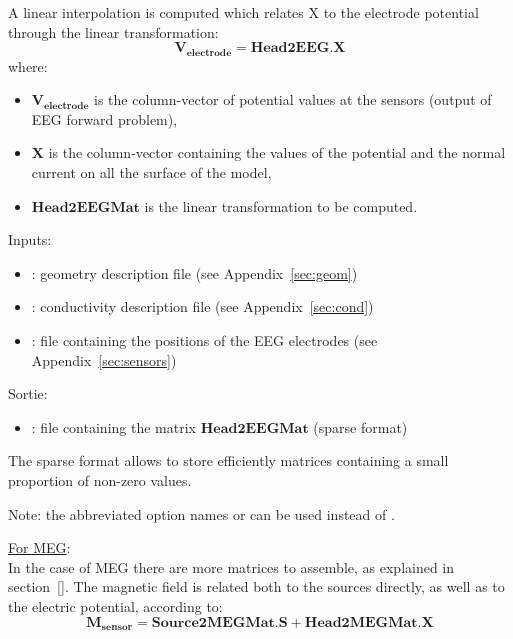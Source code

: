 A linear interpolation is computed which relates X to the electrode potential through the linear transformation:
\[
    \mathbf{V_{electrode}} = \mathbf{Head2EEG} . \mathbf{X}
\]
where:
\begin{itemize}
    \item $\mathbf{V_{electrode}}$ is the column-vector of potential values at the sensors (output of EEG forward problem),
    \item $\mathbf{X}$ is the column-vector containing the values of the potential and the normal current on all the surface of the model,
    \item $\mathbf{Head2EEGMat}$ is the linear transformation to be computed.
\end{itemize}

\bigskip

\noindent
Inputs:
\begin{itemize}
    \item {}: geometry description file (see Appendix~\ref{sec:geom})
    \item {}: conductivity description file (see Appendix~\ref{sec:cond})
    \item {}: file containing the positions of the EEG electrodes (see Appendix~\ref{sec:sensors})
\end{itemize}
Sortie:
\begin{itemize}
    \item {}: file containing the matrix $\mathbf{Head2EEGMat}$ (sparse format)
\end{itemize}
The sparse format allows to store efficiently matrices containing a small proportion of non-zero values.
\medskip

\noindent
{}
\medskip
Note: the abbreviated option names  or  can be used instead of .

\bigskip

\checkItem \underline{For MEG}:\\
In the case of MEG there are more matrices to assemble, as explained in section~\ref{}. The magnetic field is related both to the sources directly, as well as to the electric  potential, according to:
\[
    \mathbf{M_{sensor}} = \mathbf{Source2MEGMat} . \mathbf{S} + \mathbf{Head2MEGMat}.\mathbf{X}
\]

